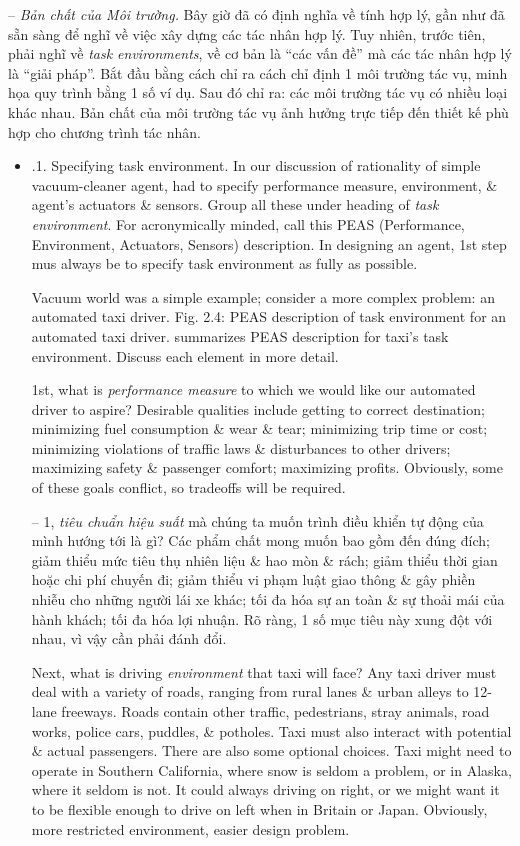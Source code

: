 \documentclass{article}
\begin{document}
\begin{itemize}
\begin{itemize}
\begin{itemize}
			-- {\it Bản chất của Môi trường.} Bây giờ đã có định nghĩa về tính hợp lý, gần như đã sẵn sàng để nghĩ về việc xây dựng các tác nhân hợp lý. Tuy nhiên, trước tiên, phải nghĩ về {\it task environments}, về cơ bản là ``các vấn đề'' mà các tác nhân hợp lý là ``giải pháp''. Bắt đầu bằng cách chỉ ra cách chỉ định 1 môi trường tác vụ, minh họa quy trình bằng 1 số ví dụ. Sau đó chỉ ra: các môi trường tác vụ có nhiều loại khác nhau. Bản chất của môi trường tác vụ ảnh hưởng trực tiếp đến thiết kế phù hợp cho chương trình tác nhân.
			\begin{itemize}
				\item {.1. Specifying task environment.} In our discussion of rationality of simple vacuum-cleaner agent, had to specify performance measure, environment, \& agent's actuators \& sensors. Group all these under heading of {\it task environment}. For acronymically minded, call this PEAS (Performance, Environment, Actuators, Sensors) description. In designing an agent, 1st step mus always be to specify task environment as fully as possible.
				
				Vacuum world was a simple example; consider a more complex problem: an automated taxi driver. {\sf Fig. 2.4: PEAS description of task environment for an automated taxi driver.} summarizes PEAS description for taxi's task environment. Discuss each element in more detail.
				
				1st, what is {\it performance measure} to which we would like our automated driver to aspire? Desirable qualities include getting to correct destination; minimizing fuel consumption \& wear \& tear; minimizing trip time or cost; minimizing violations of traffic laws \& disturbances to other drivers; maximizing safety \& passenger comfort; maximizing profits. Obviously, some of these goals conflict, so tradeoffs will be required.
				
				-- 1, {\it tiêu chuẩn hiệu suất} mà chúng ta muốn trình điều khiển tự động của mình hướng tới là gì? Các phẩm chất mong muốn bao gồm đến đúng đích; giảm thiểu mức tiêu thụ nhiên liệu \& hao mòn \& rách; giảm thiểu thời gian hoặc chi phí chuyến đi; giảm thiểu vi phạm luật giao thông \& gây phiền nhiễu cho những người lái xe khác; tối đa hóa sự an toàn \& sự thoải mái của hành khách; tối đa hóa lợi nhuận. Rõ ràng, 1 số mục tiêu này xung đột với nhau, vì vậy cần phải đánh đổi.
				
				Next, what is driving {\it environment} that taxi will face? Any taxi driver must deal with a variety of roads, ranging from rural lanes \& urban alleys to 12-lane freeways. Roads contain other traffic, pedestrians, stray animals, road works, police cars, puddles, \& potholes. Taxi must also interact with potential \& actual passengers. There are also some optional choices. Taxi might need to operate in Southern California, where snow is seldom a problem, or in Alaska, where it seldom is not. It could always driving on right, or we might want it to be flexible enough to drive on left when in Britain or Japan. Obviously, more restricted environment, easier design problem.
				

\end{itemize}
\end{itemize}
\end{itemize}
\end{itemize}
\end{document}
